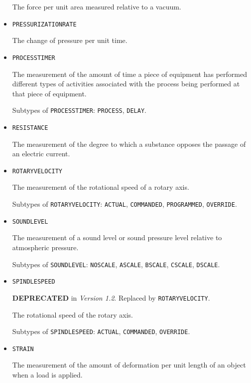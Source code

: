 \begin{itemize}
The force per unit area measured relative to a vacuum.


\item \texttt{PRESSURIZATION\textunderscore RATE}  

The change of pressure per unit time.


\item \texttt{PROCESS\textunderscore TIMER}  

The measurement of the amount of time a piece of equipment has performed different types of activities associated with the process being performed at that piece of equipment.

Subtypes of \texttt{PROCESS\textunderscore TIMER}: \texttt{PROCESS}, \texttt{DELAY}.

\item \texttt{RESISTANCE}  

The measurement of the degree to which a substance opposes the passage of an electric current.


\item \texttt{ROTARY\textunderscore VELOCITY}  

The measurement of the rotational speed of a rotary axis.

Subtypes of \texttt{ROTARY\textunderscore VELOCITY}: \texttt{ACTUAL}, \texttt{COMMANDED}, \texttt{PROGRAMMED}, \texttt{OVERRIDE}.

\item \texttt{SOUND\textunderscore LEVEL}  

The measurement of a sound level or sound pressure level relative to atmospheric pressure.

Subtypes of \texttt{SOUND\textunderscore LEVEL}: \texttt{NO\textunderscore SCALE}, \texttt{A\textunderscore SCALE}, \texttt{B\textunderscore SCALE}, \texttt{C\textunderscore SCALE}, \texttt{D\textunderscore SCALE}.

\item \texttt{SPINDLE\textunderscore SPEED}  

\textbf{DEPRECATED} in \textit{Version 1.2}.  Replaced by \texttt{ROTARY\textunderscore VELOCITY}.

The rotational speed of the rotary axis.

Subtypes of \texttt{SPINDLE\textunderscore SPEED}: \texttt{ACTUAL}, \texttt{COMMANDED}, \texttt{OVERRIDE}.

\item \texttt{STRAIN}  

The measurement of the amount of deformation per unit length of an object when a load is applied.



\end{itemize}
